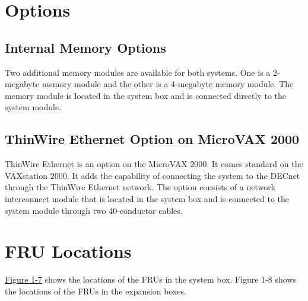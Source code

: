 \label{figure:1-6}

\newpage

\section{Options}
\subsection{Internal Memory Options}

Two additional memory modules are available for both systems. One is a 
2-megabyte memory module and the other is a 4-megabyte memory module.
The memory module is located in the system box and is connected directly
to the system module.

\subsection{ThinWire Ethernet Option on MicroVAX 2000}

ThinWire Ethernet is an option on the MicroVAX 2000. It comes standard
on the VAXstation 2000. It adds the capability of connecting the system to
the DECnet through the ThinWire Ethernet network. The option consists
of a network interconnect module that is located in the system box and is
connected to the system module through two 40-conductor cables.

\section{FRU Locations}

\hyperref[figure:1-7]{Figure 1-7} shows the locations of the FRUs in the system box. Figure 1-8
shows the locations of the FRUs in the expansion boxes.

\label{figure:1-7}

\newpage

\label{figure:1-7}

